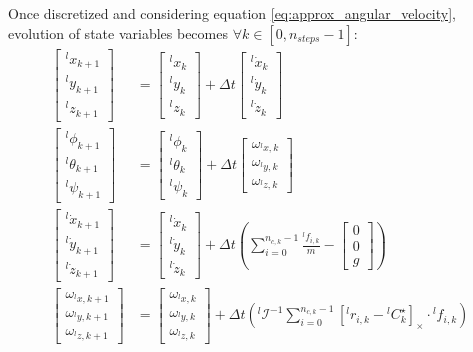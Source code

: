 \documentclass[a4paper,11pt]{article}
\begin{document}
Once discretized and considering equation \ref{eq:approx_angular_velocity}, evolution of state variables becomes $\forall k \in [0, n_{steps}-1]$:
\begin{align}
\begin{bmatrix} {}^l\! x_{k+1} \\ {}^l\! y_{k+1} \\ {}^l\! z_{k+1} \end{bmatrix} &= \begin{bmatrix} {}^l\! x_{k} \\ {}^l\! y_{k} \\ {}^l\! z_{k} \end{bmatrix} + \Delta t \begin{bmatrix} {}^l\! \dot x_{k} \\ {}^l\! \dot y_{k} \\ {}^l\! \dot z_{k} \end{bmatrix} \\
\begin{bmatrix} {}^l\! \phi_{k+1} \\ {}^l\! \theta_{k+1} \\ {}^l\! \psi_{k+1} \end{bmatrix} &= \begin{bmatrix} {}^l\! \phi_{k} \\ {}^l\! \theta_{k} \\ {}^l\! \psi_{k} \end{bmatrix} + \Delta t \begin{bmatrix}  \omega_{{}^l\!x,k} \\  \omega_{{}^l\!y,k} \\ \omega_{{}^l\! z,k} \end{bmatrix} \\
\begin{bmatrix} {}^l\! \dot x_{k+1} \\ {}^l\! \dot y_{k+1} \\ {}^l\! \dot z_{k+1} \end{bmatrix} &= \begin{bmatrix} {}^l\! \dot x_{k} \\ {}^l\! \dot y_{k} \\ {}^l\! \dot z_{k} \end{bmatrix} + \Delta t \left( \sum_{i=0}^{n_{c,k} - 1} \frac{{}^l\!f_{i,k}}{m} - \begin{bmatrix} 0 \\ 0 \\ g \end{bmatrix}  \right) \\
\begin{bmatrix} \omega_{{}^l\!x,k+1} \\  \omega_{{}^l\!y,k+1} \\ \omega_{{}^l\! z,k+1} \end{bmatrix} &= \begin{bmatrix}  \omega_{{}^l\!x,k} \\  \omega_{{}^l\!y,k} \\ \omega_{{}^l\! z,k} \end{bmatrix} + \Delta t \left( {}^l\!\mathcal{I}^{-1}\sum_{i=0}^{n_{c,k} - 1} [{}^l\!r_{i,k} - {}^l\!C_{k}^\star]_\times \cdot {}^l\!f_{i,k}   \right)
\end{align}
\end{document}
